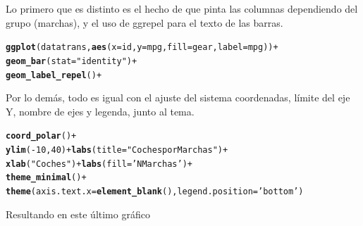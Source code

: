 \documentclass{article}\usepackage[]{graphicx}\usepackage[]{color}
\makeatletter
\newcommand{\hlnum}[1]{\textcolor[rgb]{0.686,0.059,0.569}{#1}}%
\newcommand{\hlstr}[1]{\textcolor[rgb]{0.192,0.494,0.8}{#1}}%
\newcommand{\hlopt}[1]{\textcolor[rgb]{0,0,0}{#1}}%
\newcommand{\hlstd}[1]{\textcolor[rgb]{0.345,0.345,0.345}{#1}}%
\newcommand{\hlkwc}[1]{\textcolor[rgb]{0.333,0.667,0.333}{#1}}%
\newcommand{\hlkwd}[1]{\textcolor[rgb]{0.737,0.353,0.396}{\textbf{#1}}}%
\newenvironment{kframe}{%
 \def\at@end@of@kframe{}%
 \ifinner\ifhmode%
  \def\at@end@of@kframe{\end{minipage}}%
  \begin{minipage}{\columnwidth}%
 \fi\fi%
 \def\FrameCommand##1{\hskip\@totalleftmargin \hskip-\fboxsep
 \colorbox{shadecolor}{##1}\hskip-\fboxsep
     \hskip-\linewidth \hskip-\@totalleftmargin \hskip\columnwidth}%
 \MakeFramed {\advance\hsize-\width
   \@totalleftmargin\z@ \linewidth\hsize
   \@setminipage}}%
 {\par\unskip\endMakeFramed%
 \at@end@of@kframe}
\newenvironment{knitrout}{}{} %
\makeatother
\begin{document}
Lo primero que es distinto es el hecho de que pinta las columnas dependiendo del grupo (marchas), y el uso de ggrepel para el texto de las barras.
\begin{knitrout}
\color{fgcolor}\begin{kframe}
\begin{alltt}
\hlkwd{ggplot}(datatrans , \hlkwd{aes}(x=id, y=mpg, fill= gear, label=mpg))+
  \hlkwd{geom_bar}(stat = \hlstr{"identity"}) +
  \hlkwd{geom_label_repel}() +
\end{alltt}
\end{kframe}
\end{knitrout}
Por lo dem\'as, todo es igual con el ajuste del sistema coordenadas, l\'imite del eje Y, nombre de ejes y legenda, junto al tema.
\begin{knitrout}
\color{fgcolor}\begin{kframe}
\begin{alltt}
  \hlkwd{coord_polar}\hlstd{()} \hlopt{+}
  \hlkwd{ylim}\hlstd{(}\hlopt{-}\hlnum{10}\hlstd{,}\hlnum{40}\hlstd{)} \hlopt{+} \hlkwd{labs}\hlstd{(}\hlkwc{title} \hlstd{=} \hlstr{"Coches por Marchas"}\hlstd{)} \hlopt{+}
  \hlkwd{xlab}\hlstd{(}\hlstr{"Coches"}\hlstd{)} \hlopt{+} \hlkwd{labs}\hlstd{(}\hlkwc{fill}\hlstd{=}\hlstr{'N Marchas'}\hlstd{)} \hlopt{+}
  \hlkwd{theme_minimal}\hlstd{()} \hlopt{+}
  \hlkwd{theme}\hlstd{(}\hlkwc{axis.text.x} \hlstd{=} \hlkwd{element_blank}\hlstd{(),} \hlkwc{legend.position} \hlstd{=} \hlstr{'bottom'}\hlstd{)}
\end{alltt}
\end{kframe}
\end{knitrout}
Resultando en este \'ultimo gr\'afico
\end{document}
